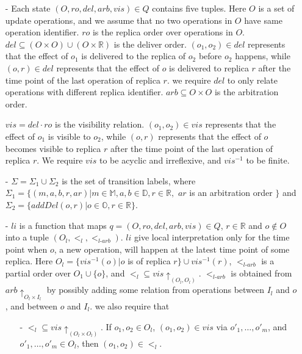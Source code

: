 \begin{itemize}
\setlength{\itemsep}{0.5pt}
\item[-] Each state $(O,ro,del,arb,vis) \in Q$ contains five tuples. Here $O$ is a set of update operations, and we assume that no two operations in $O$ have same operation identifier. $ro$ is the replica order over operations in $O$. $del \subseteq (O \times O) \cup (O \times \mathbb{R})$ is the deliver order. $(o_1,o_2) \in del$ represents that the effect of $o_1$ is delivered to the replica of $o_2$ before $o_2$ happens, while $(o,r) \in del$ represents that the effect of $o$ is delivered to replica $r$ after the time point of the last operation of replica $r$. we require $del$ to only relate operations with different replica identifier. $arb \subseteq O \times O$ is the arbitration order.

    $vis = del \cdot ro$ is the visibility relation. $(o_1,o_2) \in vis$ represents that the effect of $o_1$ is visible to $o_2$, while $(o,r)$ represents that the effect of $o$ becomes visible to replica $r$ after the time point of the last operation of replica $r$. We require $vis$ to be acyclic and irreflexive, and $vis^{-1}$ to be finite.

\item[-] $\Sigma = \Sigma_1 \cup \Sigma_2$ is the set of transition labels, where $\Sigma_1 = \{ (m,a,b,r,ar) \vert m \in \mathbb{M}, a,b \in \mathbb{D}, r \in \mathbb{R},$ $ar$ is an arbitration order $\}$ and $\Sigma_2 = \{ addDel(o,r) \vert o \in \mathbb{O}, r \in \mathbb{R} \}$.

\item[-] $li$ is a function that maps $q = (O,ro,del,arb,vis) \in Q$, $r \in \mathbb{R}$ and $o \notin O$ into a tuple $( O_l ,<_l, <_{\textit{l-arb}} )$. $li$ give local interpretation only for the time point when $o$, a new operation, will happen at the latest time point of some replica. Here $O_l = \{ vis^{-1}(o) \vert o$ is of replica $r \} \cup vis^{-1}(r)$, $<_{\textit{l-arb}}$ is a partial order over $O_1 \cup \{ o \}$, and $<_l \subseteq vis \uparrow_{(O_l,O_l)}$. $<_{\textit{l-arb}}$ is obtained from $arb \uparrow_{O_l \times I_l}$ by possibly adding some relation from operations between $I_l$ and $o$, and  between $o$ and $I_l$. we also require that

    \begin{itemize}
    \setlength{\itemsep}{0.5pt}
    \item[-] $<_l \subseteq vis \uparrow_{(O_l \times O_l)}$. If $o_1,o_2 \in O_l$, $(o_1,o_2) \in vis$ via $o'_1,\ldots,o'_m$, and $o'_1,\ldots,o'_m \in O_l$, then $(o_1,o_2) \in <_l$.


\end{itemize}
\end{itemize}
